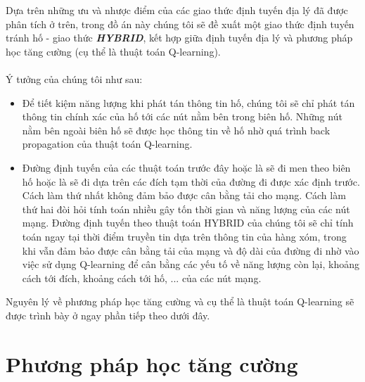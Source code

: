 \documentclass[12pt]{report}
\begin{document}
Dựa trên những ưu và nhược điểm của các giao thức định tuyến địa lý đã được phân tích ở trên, trong đồ án này chúng tôi sẽ đề xuất một giao thức định tuyến tránh hố - giao thức \textbf{\textit{HYBRID}}, kết hợp giữa định tuyến địa lý và phương pháp học tăng cường (cụ thể là thuật toán Q-learning).\\ \\ 
Ý tưởng của chúng tôi như sau:
\begin{itemize}
\item Để tiết kiệm năng lượng khi phát tán thông tin hố, chúng tôi sẽ chỉ phát tán thông tin chính xác của hố tới các nút nằm bên trong biên hố. Những nút nằm bên ngoài biên hố sẽ được học thông tin về hố nhờ quá trình back propagation của thuật toán Q-learning.
\item Đường định tuyến của các thuật toán trước đây hoặc là sẽ đi men theo biên hố hoặc là sẽ đi dựa trên các đích tạm thời của đường đi được xác định trước. Cách làm thứ nhất không đảm bảo được cân bằng tải cho mạng. Cách làm thứ hai đòi hỏi tính toán nhiều gây tốn thời gian và năng lượng của các nút mạng. Đường định tuyến theo thuật toán HYBRID của chúng tôi sẽ chỉ tính toán ngay tại thời điểm truyền tin dựa trên thông tin của hàng xóm, trong khi vẫn đảm bảo được cân bằng tải của mạng và độ dài của đường đi nhờ vào việc sử dụng Q-learning để cân bằng các yếu tố về năng lượng còn lại, khoảng cách tới đích, khoảng cách tới hố, ... của các nút mạng.
\end{itemize}
Nguyên lý về phương pháp học tăng cường và cụ thể là thuật toán Q-learning sẽ được trình bày ở ngay phần tiếp theo dưới đây.
\chapter{Phương pháp học tăng cường}
\label{sec:3}
\end{document}
